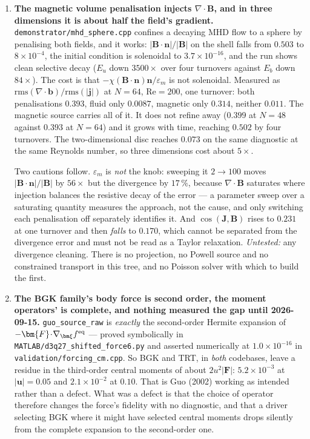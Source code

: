\documentclass[11pt,a4paper]{article}
\newcommand{\code}[1]{\texttt{\small #1}}
\begin{document}
\begin{enumerate}[leftmargin=1.4em,itemsep=4pt]
\item \textbf{The magnetic volume penalisation injects $\nabla\!\cdot\!\bm{B}$, and
  in three dimensions it is about half the field's gradient.}
  \code{demonstrator/mhd\_sphere.cpp} confines a decaying MHD flow to a sphere by
  penalising both fields, and it works: $|\bm{B}\!\cdot\!\bm{n}|/|\bm{B}|$ on the
  shell falls from $0.503$ to $8\times10^{-4}$, the initial condition is
  solenoidal to $3.7\times10^{-16}$, and the run shows clean selective decay
  ($E_u$ down $3500\times$ over four turnovers against $E_b$ down $84\times$).
  The cost is that $-\chi(\bm{B}\!\cdot\!\bm{n})\bm{n}/\varepsilon_m$ is not
  solenoidal. Measured as $\mathrm{rms}(\nabla\!\cdot\!\bm{b})/\mathrm{rms}(|\bm{j}|)$
  at $N=64$, $\mathrm{Re}=200$, one turnover: both penalisations $0.393$, fluid
  only $\mathbf{0.0087}$, magnetic only $\mathbf{0.314}$, neither $0.011$. The
  magnetic source carries all of it. It does not refine away ($0.399$ at $N=48$
  against $0.393$ at $N=64$) and it grows with time, reaching $0.502$ by four
  turnovers. The two-dimensional disc reaches $0.073$ on the same diagnostic at
  the same Reynolds number, so three dimensions cost about $5\times$.

  Two cautions follow. $\varepsilon_m$ is \emph{not} the knob: sweeping it
  $2\to100$ moves $|\bm{B}\!\cdot\!\bm{n}|/|\bm{B}|$ by $56\times$ but the
  divergence by $17\,\%$, because $\nabla\!\cdot\!\bm{B}$ saturates where
  injection balances the resistive decay of the error --- a parameter sweep over
  a saturating quantity measures the approach, not the cause, and only switching
  each penalisation off separately identifies it. And $\cos(\bm{J},\bm{B})$ rises
  to $0.231$ at one turnover and then \emph{falls} to $0.170$, which cannot be
  separated from the divergence error and must not be read as a Taylor
  relaxation. \emph{Untested:} any divergence cleaning. There is no projection,
  no Powell source and no constrained transport in this tree, and no Poisson
  solver with which to build the first.

\item \textbf{The BGK family's body force is second order, the moment operators'
  is complete, and nothing measured the gap until 2026-09-15.}
  \code{guo\_source\_raw} is \emph{exactly} the second-order Hermite expansion of
  $-\bm{F}\!\cdot\!\nabla_{\bm\xi}f^{\rm eq}$ --- proved symbolically in
  \code{MATLAB/d3q27\_shifted\_force6.py} and asserted numerically at
  $1.0\times10^{-16}$ in \code{validation/forcing\_cm.cpp}. So BGK and TRT, in
  \emph{both} codebases, leave a residue in the third-order central moments of
  about $2u^{2}|\bm{F}|$: $5.2\times10^{-3}$ at $|\bm{u}|=0.05$ and
  $2.1\times10^{-2}$ at $0.10$. That is Guo (2002) working as intended rather
  than a defect. What was a defect is that the choice of operator therefore
  changes the force's fidelity with no diagnostic, and that a driver selecting
  BGK where it might have selected central moments drops silently from the
  complete expansion to the second-order one.


\end{enumerate}
\end{document}
